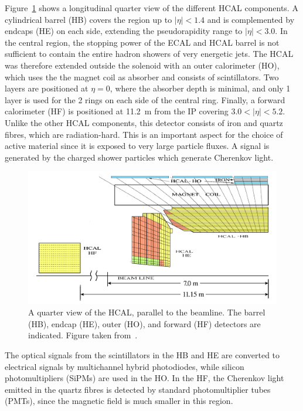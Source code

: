Figure~\ref{fig:hcal} shows a longitudinal quarter view of the different \ac{HCAL} components. A cylindrical barrel (HB) covers the region up to $|\eta| < 1.4$ and is complemented by endcaps (HE) on each side, extending the pseudorapidity range to $|\eta| < 3.0$. In the central region, the stopping power of the \ac{ECAL} and \ac{HCAL} barrel is not sufficient to contain the entire hadron showers of very energetic jets. The \ac{HCAL} was therefore extended outside the solenoid with an outer calorimeter (HO), which uses the the magnet coil as absorber and consists of scintillators. Two layers are positioned at $\eta = 0$, where the absorber depth is minimal, and only 1 layer is used for the 2 rings on each side of the central ring. Finally, a forward calorimeter (HF) is positioned at 11.2~m from the \ac{IP} covering $3.0 < |\eta| < 5.2$. Unlike the other \ac{HCAL} components, this detector consists of iron and quartz fibres, which are radiation-hard. This is an important aspect for the choice of active material since it is exposed to very large particle fluxes. A signal is generated by the charged shower particles which generate Cherenkov light.

\begin{figure}[ht]
  \centering
 \includegraphics[width=.8\textwidth]{hcal}
 \caption{A quarter view of the \protect\acf{HCAL}, parallel to the beamline. The barrel (HB), endcap (HE), outer (HO), and forward (HF) detectors are indicated. Figure taken from~\cite{Chatrchyan:2008aa}.}
 \label{fig:hcal}
\end{figure}

The optical signals from the scintillators in the HB and HE are converted to electrical signals by multichannel hybrid photodiodes, while silicon photomultipliers (SiPMs) are used in the HO. In the HF, the Cherenkov light emitted in the quartz fibres is detected by standard photomultiplier tubes (PMTs), since the magnetic field is much smaller in this region.


